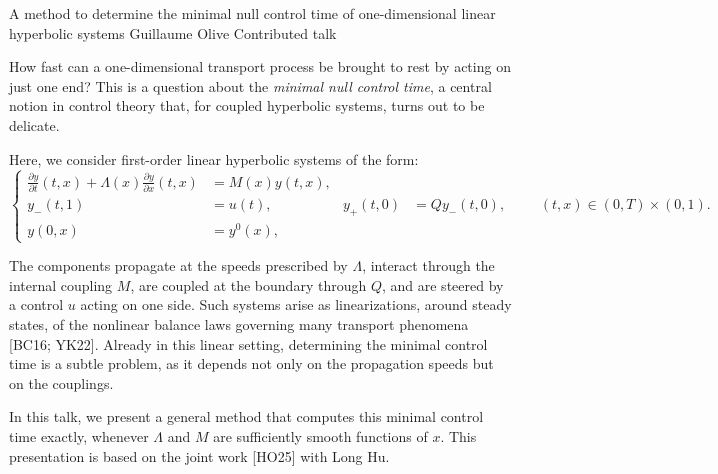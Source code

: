 \abstractheading
  {A method to determine the minimal null control time of one-dimensional linear hyperbolic systems}
  {Guillaume Olive}
  {\affilJagiellonian}
  {Contributed talk}

How fast can a one-dimensional transport process be brought to rest by acting on
just one end? This is a question about the \emph{minimal null control time}, a
central notion in control theory that, for coupled hyperbolic systems, turns out
to be delicate.

Here, we consider first-order linear hyperbolic systems of the form:
\[
\left\{
\begin{aligned}
\frac{\partial y}{\partial t}(t,x)
  +\Lambda(x)\frac{\partial y}{\partial x}(t,x)
  &=M(x)y(t,x),\\
y_{-}(t,1)&=u(t),
  &y_{+}(t,0)&=Qy_{-}(t,0),\\
y(0,x)&=y^{0}(x),
\end{aligned}
\right.
\qquad (t,x)\in(0,T)\times(0,1).
\]

The components propagate at the speeds prescribed by $\Lambda$, interact
through the internal coupling $M$, are coupled at the boundary through $Q$,
and are steered by a control $u$ acting on one side. Such systems arise as
linearizations, around steady states, of the nonlinear balance laws governing
many transport phenomena [BC16; YK22]. Already in this linear setting,
determining the minimal control time is a subtle problem, as it depends not only
on the propagation speeds but on the couplings.

In this talk, we present a general method that computes this minimal control time
exactly, whenever $\Lambda$ and $M$ are sufficiently smooth functions of
$x$. This presentation is based on the joint work [HO25] with Long Hu.

\begin{abstractreferences}
\end{abstractreferences}

